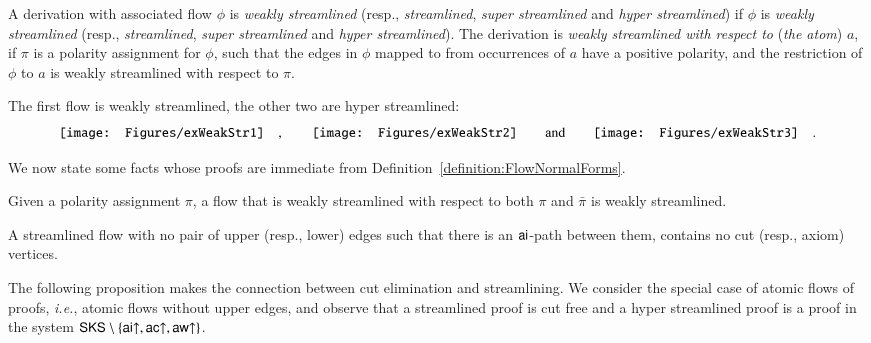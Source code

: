 \begin{definition}\label{definition:DerStreamlined}
A derivation with associated flow $\phi$ is \emph{weakly streamlined} (resp., \emph{streamlined}, \emph{super streamlined} and \emph{hyper streamlined}) if $\phi$ is \emph{weakly streamlined} (resp., \emph{streamlined}, \emph{super streamlined} and \emph{hyper streamlined}). The derivation is \emph{weakly streamlined with respect to} (\emph{the atom}) $a$, if $\pi$ is a polarity assignment for $\phi$, such that the edges in $\phi$ mapped to from occurrences of $a$ have a positive polarity, and the restriction of $\phi$ to $a$ is weakly streamlined with respect to $\pi$.
\end{definition}

\begin{example}\label{example:Streamlined}
The first flow is weakly streamlined, the other two are hyper streamlined:
\[
\vcenter{\hbox{\texttt{[image: Figures/exWeakStr1]}}}
\quad,\qquad
\vcenter{\hbox{\texttt{[image: Figures/exWeakStr2]}}}
\qquad\hbox{and}\qquad
\vcenter{\hbox{\texttt{[image: Figures/exWeakStr3]}}}
\quad.
\]
\end{example}

We now state some facts whose proofs are immediate from Definition~\vref{definition:FlowNormalForms}.

\begin{proposition}\label{proposition:FlowWeaklyStreamlinedPolarity}
Given a polarity assignment $\pi$, a flow that is weakly streamlined with respect to both $\pi$ and $\bar\pi$ is weakly streamlined.
\end{proposition}

\begin{proposition}\label{proposition:FlowCutFree}
A streamlined flow with no pair of upper (resp., lower) edges such that there is an ${\mathsf{ai}}$-path between them, contains no cut (resp., axiom) vertices.
\end{proposition}


The following proposition makes the connection between cut elimination and streamlining. We consider the special case of atomic flows of proofs, \emph{i.e.}, atomic flows without upper edges, and observe that a streamlined proof is cut free and a hyper streamlined proof is a proof in the system $\mathsf{SKS}\setminus\{{{\mathsf{ai}}{\uparrow}},{{\mathsf{ac}}{\uparrow}},{{\mathsf{aw}}{\uparrow}}\}$.

